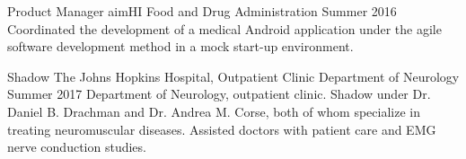 

\begin{cventries}

  \cventry
    {Product Manager} %
    {aimHI} %
    {Food and Drug Administration} %
    {Summer 2016} %
    {
      Coordinated the development of a medical Android application under the agile software development method in a mock start-up environment.
    }

  \cventry
    {Shadow} %
    {The Johns Hopkins Hospital, Outpatient Clinic} %
    {Department of Neurology} %
    {Summer 2017} %
    {
      Department of Neurology, outpatient clinic. Shadow under Dr. Daniel B. Drachman and Dr. Andrea M. Corse, both of whom specialize in treating neuromuscular diseases. Assisted doctors with patient care and EMG nerve conduction studies.
    }

\end{cventries}
